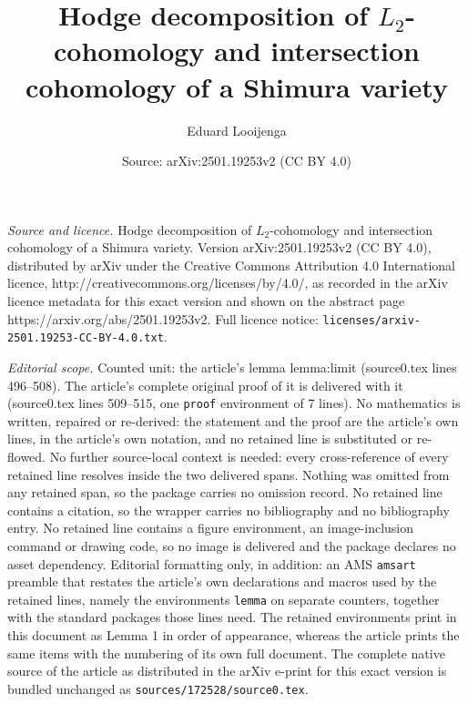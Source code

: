 \documentclass[10pt,a4paper]{amsart}
\title{Hodge decomposition of $L_2$-cohomology and intersection cohomology of a Shimura variety}
\author{Eduard Looijenga}
\date{Source: arXiv:2501.19253v2 (CC BY 4.0)}
\begin{document}
\maketitle

\noindent\emph{Source and licence.} Hodge decomposition of $L_2$-cohomology and intersection cohomology of a Shimura variety. Version arXiv:2501.19253v2 (CC BY 4.0), distributed by arXiv under the Creative Commons Attribution 4.0 International licence, http://creativecommons.org/licenses/by/4.0/, as recorded in the arXiv licence metadata for this exact version and shown on the abstract page https://arxiv.org/abs/2501.19253v2. Full licence notice: \texttt{licenses/arxiv-2501.19253-CC-BY-4.0.txt}.\par\smallskip

\noindent\textit{Editorial scope.} Counted unit: the article's lemma lemma:limit (source0.tex lines 496--508). The article's complete original proof of it is delivered with it (source0.tex lines 509--515, one \texttt{proof} environment of 7 lines). No mathematics is written, repaired or re-derived: the statement and the proof are the article's own lines, in the article's own notation, and no retained line is substituted or re-flowed.  No further source-local context is needed: every cross-reference of every retained line resolves inside the two delivered spans.  Nothing was omitted from any retained span, so the package carries no omission record.  No retained line contains a citation, so the wrapper carries no bibliography and no bibliography entry.  No retained line contains a figure environment, an image-inclusion command or drawing code, so no image is delivered and the package declares no asset dependency.  Editorial formatting only, in addition: an AMS \texttt{amsart} preamble that restates the article's own declarations and macros used by the retained lines, namely the environments \texttt{lemma} on separate counters, together with the standard packages those lines need.  The retained environments print in this document as Lemma 1 in order of appearance, whereas the article prints the same items with the numbering of its own full document.  The complete native source of the article as distributed in the arXiv e-print for this exact version is bundled unchanged as \texttt{sources/172528/source0.tex}.
\end{document}
